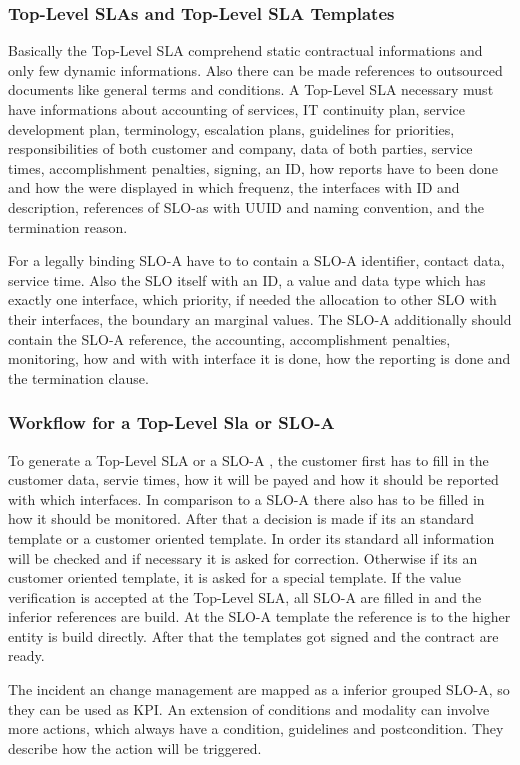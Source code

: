 \subsubsection{Top-Level SLAs and Top-Level SLA Templates}
Basically the Top-Level SLA comprehend static contractual informations and only few dynamic informations. Also there can be made references to outsourced documents like general terms and conditions. A Top-Level SLA necessary must have informations about accounting of services, IT continuity plan, service development plan, terminology, escalation plans, guidelines for priorities, responsibilities of both customer and company, data of both parties, service times, accomplishment penalties, signing, an ID, how reports have to been done and how the were displayed in which frequenz, the interfaces with ID and description, references of SLO-as with UUID and naming convention, and the termination reason.

For a legally binding SLO-A have to to contain a SLO-A identifier, contact data, service time. Also the SLO itself with an ID, a value and data type which has exactly one interface, which priority, if needed the allocation to other SLO with their interfaces, the boundary an marginal values. The SLO-A additionally should contain the SLO-A reference, the accounting, accomplishment penalties, monitoring, how and with with interface it is done, how the reporting is done and the termination clause.

\subsubsection{Workflow for a Top-Level Sla or SLO-A}
To generate a Top-Level SLA or a SLO-A , the customer first has to fill in the customer data,  servie times, how it will be payed and how it should be reported with which interfaces. In comparison to a SLO-A there also has to be filled in how it should be monitored. After that a decision is made if its an standard template or a customer oriented template. In order its standard all information will be checked and if necessary it is asked for correction. Otherwise if its an customer oriented template, it is asked for a special template.  If the value verification is accepted at the Top-Level SLA, all SLO-A are filled in and the inferior references are build. At the SLO-A template the reference is to the higher entity is build directly. After that the templates got signed and the contract are ready. 

The incident an change management are mapped as a inferior grouped SLO-A, so they can be used as KPI. An extension of conditions and modality can involve more actions, which always have a condition, guidelines and postcondition. They describe how the action will be triggered.

